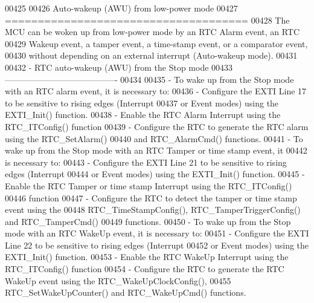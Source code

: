 \begin{DoxyCode}
00425 \textcolor{comment}{}
00426 \textcolor{comment}{   Auto-wakeup (AWU) from low-power mode}
00427 \textcolor{comment}{   =====================================}
00428 \textcolor{comment}{   The MCU can be woken up from low-power mode by an RTC Alarm event, an RTC }
00429 \textcolor{comment}{   Wakeup event, a tamper event, a time-stamp event, or a comparator event, }
00430 \textcolor{comment}{   without depending on an external interrupt (Auto-wakeup mode).}
00431 \textcolor{comment}{}
00432 \textcolor{comment}{   - RTC auto-wakeup (AWU) from the Stop mode}
00433 \textcolor{comment}{     ----------------------------------------}
00434 \textcolor{comment}{     }
00435 \textcolor{comment}{     - To wake up from the Stop mode with an RTC alarm event, it is necessary to:}
00436 \textcolor{comment}{       - Configure the EXTI Line 17 to be sensitive to rising edges (Interrupt }
00437 \textcolor{comment}{         or Event modes) using the EXTI\_Init() function.}
00438 \textcolor{comment}{       - Enable the RTC Alarm Interrupt using the RTC\_ITConfig() function}
00439 \textcolor{comment}{       - Configure the RTC to generate the RTC alarm using the RTC\_SetAlarm() }
00440 \textcolor{comment}{         and RTC\_AlarmCmd() functions.}
00441 \textcolor{comment}{     - To wake up from the Stop mode with an RTC Tamper or time stamp event, it }
00442 \textcolor{comment}{       is necessary to:}
00443 \textcolor{comment}{       - Configure the EXTI Line 21 to be sensitive to rising edges (Interrupt }
00444 \textcolor{comment}{         or Event modes) using the EXTI\_Init() function.}
00445 \textcolor{comment}{       - Enable the RTC Tamper or time stamp Interrupt using the RTC\_ITConfig() }
00446 \textcolor{comment}{         function}
00447 \textcolor{comment}{       - Configure the RTC to detect the tamper or time stamp event using the}
00448 \textcolor{comment}{         RTC\_TimeStampConfig(), RTC\_TamperTriggerConfig() and RTC\_TamperCmd()}
00449 \textcolor{comment}{         functions.}
00450 \textcolor{comment}{     - To wake up from the Stop mode with an RTC WakeUp event, it is necessary to:}
00451 \textcolor{comment}{       - Configure the EXTI Line 22 to be sensitive to rising edges (Interrupt }
00452 \textcolor{comment}{         or Event modes) using the EXTI\_Init() function.}
00453 \textcolor{comment}{       - Enable the RTC WakeUp Interrupt using the RTC\_ITConfig() function}
00454 \textcolor{comment}{       - Configure the RTC to generate the RTC WakeUp event using the RTC\_WakeUpClockConfig(), }
00455 \textcolor{comment}{         RTC\_SetWakeUpCounter() and RTC\_WakeUpCmd() functions.}

\end{DoxyCode}
